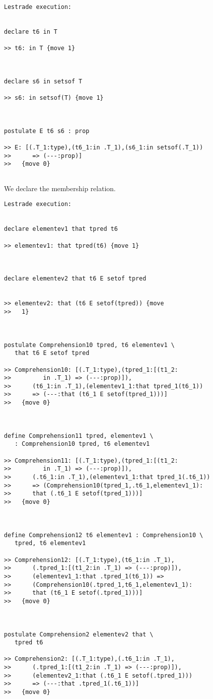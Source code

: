\documentclass[12pt]{article}
\begin{document}
\begin{verbatim}Lestrade execution:


declare t6 in T

>> t6: in T {move 1}



declare s6 in setsof T

>> s6: in setsof(T) {move 1}



postulate E t6 s6 : prop

>> E: [(.T_1:type),(t6_1:in .T_1),(s6_1:in setsof(.T_1))
>>      => (---:prop)]
>>   {move 0}


\end{verbatim}

We declare the membership relation.

\begin{verbatim}Lestrade execution:


declare elementev1 that tpred t6

>> elementev1: that tpred(t6) {move 1}



declare elementev2 that t6 E setof tpred


>> elementev2: that (t6 E setof(tpred)) {move
>>   1}



postulate Comprehension10 tpred, t6 elementev1 \
   that t6 E setof tpred

>> Comprehension10: [(.T_1:type),(tpred_1:[(t1_2:
>>         in .T_1) => (---:prop)]),
>>      (t6_1:in .T_1),(elementev1_1:that tpred_1(t6_1))
>>      => (---:that (t6_1 E setof(tpred_1)))]
>>   {move 0}



define Comprehension11 tpred, elementev1 \
   : Comprehension10 tpred, t6 elementev1

>> Comprehension11: [(.T_1:type),(tpred_1:[(t1_2:
>>         in .T_1) => (---:prop)]),
>>      (.t6_1:in .T_1),(elementev1_1:that tpred_1(.t6_1))
>>      => (Comprehension10(tpred_1,.t6_1,elementev1_1):
>>      that (.t6_1 E setof(tpred_1)))]
>>   {move 0}



define Comprehension12 t6 elementev1 : Comprehension10 \
   tpred, t6 elementev1

>> Comprehension12: [(.T_1:type),(t6_1:in .T_1),
>>      (.tpred_1:[(t1_2:in .T_1) => (---:prop)]),
>>      (elementev1_1:that .tpred_1(t6_1)) =>
>>      (Comprehension10(.tpred_1,t6_1,elementev1_1):
>>      that (t6_1 E setof(.tpred_1)))]
>>   {move 0}



postulate Comprehension2 elementev2 that \
   tpred t6

>> Comprehension2: [(.T_1:type),(.t6_1:in .T_1),
>>      (.tpred_1:[(t1_2:in .T_1) => (---:prop)]),
>>      (elementev2_1:that (.t6_1 E setof(.tpred_1)))
>>      => (---:that .tpred_1(.t6_1))]
>>   {move 0}


\end{verbatim}
\end{document}
